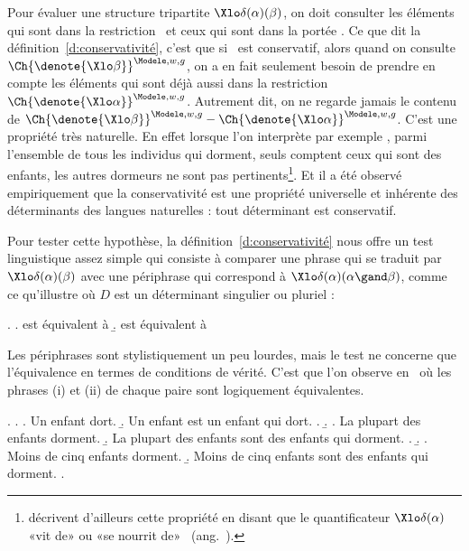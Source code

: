 Pour évaluer une structure tripartite $\Xlo\delta(\alpha)(\beta)$, on doit consulter les éléments qui sont dans la restriction \vrb\alpha\ et ceux qui sont dans la portée  \vrb\beta.  Ce que dit la définition~\ref{d:conservativité}, c'est que si \vrb\delta\ est conservatif, alors quand on consulte $\Ch{\denote{\Xlo\beta}}^{\Modele,w,g}$, on a en fait seulement besoin de prendre en compte les éléments qui sont déjà aussi dans la restriction $\Ch{\denote{\Xlo\alpha}}^{\Modele,w,g}$.  Autrement dit, on ne regarde jamais le contenu de $\Ch{\denote{\Xlo\beta}}^{\Modele,w,g}-\Ch{\denote{\Xlo\alpha}}^{\Modele,w,g}$. 
C'est une propriété très naturelle.  En effet lorsque l'on interprète par exemple , parmi l'ensemble de tous les individus qui dorment, seuls comptent ceux qui sont des enfants, les autres dormeurs ne sont pas pertinents\footnote{\citet{BarwiseCooper:81} décrivent d'ailleurs cette propriété en disant que le quantificateur $\Xlo\delta(\alpha)$ «vit de» ou «se nourrit de» \vrb\alpha\ (ang.\ ).}.
Et il a été observé empiriquement que la conservativité est une propriété universelle et inhérente des déterminants des langues naturelles : tout déterminant est conservatif.

Pour tester cette hypothèse, la définition~\ref{d:conservativité} nous offre un test linguistique assez simple qui consiste à comparer une phrase qui se traduit par $\Xlo\delta(\alpha)(\beta)$ avec une périphrase qui correspond à $\Xlo\delta(\alpha)(\alpha\gand\beta)$, comme ce qu'illustre {\Next} où $D$ est un déterminant singulier ou pluriel :

\ex.
\a.   est équivalent à 
\b.   est équivalent à 


Les périphrases sont stylistiquement un peu lourdes, mais le test ne concerne que l'équivalence en termes de conditions de vérité.
C'est que l'on observe en \Next\ où les phrases (i) et (ii) de chaque paire sont logiquement équivalentes.

\ex.
\a.
\a. Un enfant dort.
\b. Un enfant est un enfant qui dort.
\z.
\b.
\a. La plupart des enfants dorment.
\b. La plupart des enfants sont des enfants qui dorment.
\z.
\b.
\a. Moins de cinq enfants dorment.
\b. Moins de cinq enfants sont des enfants qui dorment.
\z.


\sloppy


